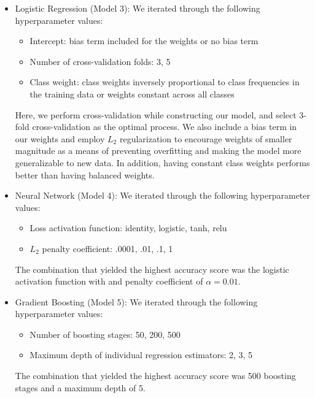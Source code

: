 \documentclass[11pt]{article}
\begin{document}
\begin{itemize}
  \item Logistic Regression (Model 3): We iterated through the following hyperparameter values:
  \begin{itemize}
      \item Intercept: bias term included for the weights or no bias term
      \item Number of cross-validation folds: 3, 5
      \item Class weight: class weights inversely proportional to class frequencies in the training data or weights constant across all classes
  \end{itemize}
  Here, we perform cross-validation while constructing our model, and select 3-fold cross-validation as the optimal process. We also include a bias term in our weights and employ $L_2$ regularization to encourage weights of smaller magnitude as a means of preventing overfitting and making the model more generalizable to new data. In addition, having constant class weights performs better than having balanced weights.
  
  
  
  \item Neural Network (Model 4): We iterated through the following hyperparameter values:
  \begin{itemize}
      \item Loss activation function: identity, logistic, tanh, relu
      \item $L_2$ penalty coefficient: .0001, .01, .1, 1
  \end{itemize}
  The combination that yielded the highest accuracy score was the logistic activation function with and penalty coefficient of $\alpha=0.01$.
  
  \item Gradient Boosting (Model 5): We iterated through the following hyperparameter values:
  \begin{itemize}
      \item Number of boosting stages: 50, 200, 500
      \item Maximum depth of individual regression estimators: 2, 3, 5
  \end{itemize}
  The combination that yielded the highest accuracy score was 500 boosting stages and a maximum depth of 5.
  
\end{itemize}
\end{document}
